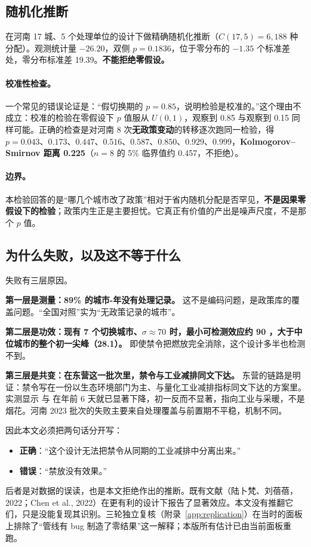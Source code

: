 \subsection{随机化推断}

在河南 17 城、5 个处理单位的设计下做精确随机化推断（$C(17,5)=6{,}188$ 种分配）。观测统计量 $-26.20$，双侧 $p=0.1836$，位于零分布的 $-1.35$ 个标准差处，零分布标准差 19.39。\textbf{不能拒绝零假设。}

\paragraph{校准性检查。} 一个常见的错误论证是：“假切换期的 $p=0.85$，说明检验是校准的。”这个理由不成立：校准的检验在零假设下 $p$ 值服从 $U(0,1)$，观察到 0.85 与观察到 0.15 同样可能。正确的检查是对河南 8 次\textbf{无政策变动}的转移逐次跑同一检验，得 $p=0.043$、$0.173$、$0.447$、$0.516$、$0.587$、$0.850$、$0.929$、$0.999$，\textbf{Kolmogorov--Smirnov 距离 0.225}（$n=8$ 的 5\% 临界值约 0.457，不拒绝）。

\paragraph{边界。} 本检验回答的是“哪几个城市改了政策”相对于省内随机分配是否罕见，\textbf{不是因果零假设下的检验}；政策内生正是主要担忧。它真正有价值的产出是噪声尺度，不是那个 $p$ 值。

\subsection{为什么失败，以及这不等于什么}\label{sec:why-fail}

失败有三层原因。

\textbf{第一层是测量：89\% 的城市-年没有处理记录。} 这不是编码问题，是政策库的覆盖问题。“全国对照”实为“无政策记录的城市”。

\textbf{第二层是功效：现有 7 个切换城市、$\sigma\approx70$ 时，最小可检测效应约 90 \ugm，大于中位城市的整个初一尖峰（28.1）。} 即使禁令把燃放完全消除，这个设计多半也检测不到。

\textbf{第三层是共变：在东营这一批次里，禁令与工业减排同文下达。} 东营的链路是明证：禁令写在一份以生态环境部门为主、与量化工业减排指标同文下达的方案里。实测显示 \NOtwo{} 与 \SOtwo{} 在年前 6 天就已显著下降，初一反而不显著，指向工业与采暖，不是烟花。河南 2023 批次的失败主要来自处理覆盖与前置期不平稳，机制不同。

因此本文必须把两句话分开写：

\begin{itemize}
  \item \textbf{正确}：“这个设计无法把禁令从同期的工业减排中分离出来。”
  \item \textbf{错误}：“禁放没有效果。”
\end{itemize}

后者是对数据的误读，也是本文拒绝作出的推断。既有文献（陆卜梵、刘蓓蓓，2022；Chen et al., 2022）在更有利的设计下报告了显著效应。本文没有推翻它们，只是没能复现其识别。三轮独立复核（附录~\ref{app:replication}）在当时的面板上排除了“管线有 bug 制造了零结果”这一解释；本版所有估计已由当前面板重跑。
